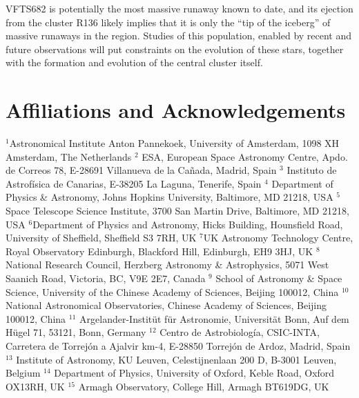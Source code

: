 \documentclass[a4paper,fleqn,usenatbib]{mnras}
\begin{document}
VFTS682 is potentially the most massive runaway known to date, and its ejection
from the cluster R136 likely implies that it is only the ``tip of the
iceberg'' of massive runaways in the
region. Studies of this population, enabled by recent and future %
observations will put constraints on the evolution
of these stars, together with the formation and evolution of
the central cluster itself.
\vspace*{-30pt}




\label{lastpage}

\vspace*{-25pt}
\section*{Affiliations and Acknowledgements}
 \tiny
\noindent $^{1}${Astronomical Institute Anton Pannekoek, University of
    Amsterdam, 1098 XH Amsterdam, The Netherlands} 
  $^{2}$ {ESA, European Space Astronomy Centre, Apdo. de Correos 78,
    E-28691 Villanueva de la Ca\~nada, Madrid, Spain} 
 $^{3}$ {Instituto de Astrof\'isica de Canarias, E-38205 La Laguna, Tenerife, Spain}
$^4$ {Department of Physics \& Astronomy, Johns Hopkins University, Baltimore, MD 21218, USA}
  $^{5}$ {Space Telescope Science Institute, 3700 San Martin Drive,
    Baltimore, MD 21218, USA}
  $^{6}${Department of Physics and Astronomy, Hicks Building,
    Hounsfield Road, University of Sheffield, Sheffield S3 7RH, UK}
  $^{7}${UK Astronomy Technology Centre, Royal Observatory Edinburgh, Blackford Hill, Edinburgh, EH9 3HJ, UK}
  $^{8}$ {National Research Council, Herzberg Astronomy \&
    Astrophysics, 5071 West Saanich Road, Victoria, BC, V9E 2E7,
    Canada}
  $^{9}$ {School of Astronomy \& Space Science, University of the Chinese
    Academy of Sciences, Beijing 100012, China}
  $^{10}$ {National Astronomical Observatories, Chinese Academy of
    Sciences, Beijing 100012, China}
  $^{11}$ {Argelander-Instit\"ut f\"ur Astronomie, Universit\"at Bonn,
    Auf dem H\"ugel 71, 53121, Bonn, Germany}
  $^{12}$ {Centro de Astrobiolog\'ia, CSIC-INTA, Carretera de Torrej\'on a Ajalvir km-4, E-28850 Torrej\'on de Ardoz, Madrid, Spain}
  $^{13}$ {Institute of Astronomy, KU Leuven, Celestijnenlaan 200 D, B-3001 Leuven, Belgium}
  $^{14}$ {Department of Physics, University of Oxford, Keble Road,
    Oxford OX13RH, UK} 
  $^{15}$ {Armagh Observatory, College Hill, Armagh BT619DG, UK}
\end{document}
